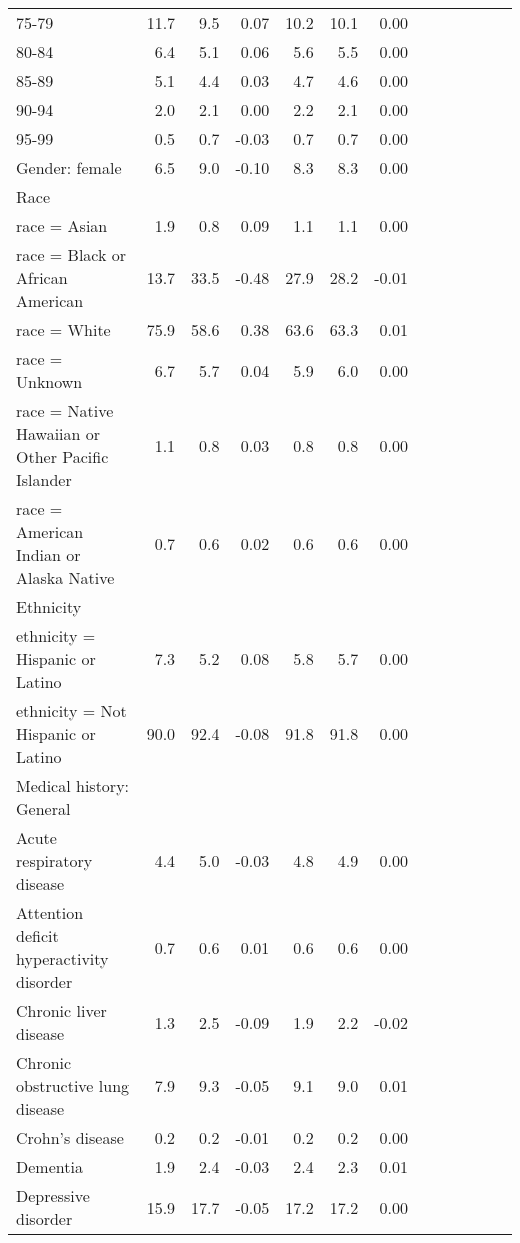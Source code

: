 \documentclass[11pt,]{article}
\begin{document}
\begin{longtable}{lrrrrrrrrrrrr}
      75-79 & 11.7 &  9.5 &  0.07 & 10.2 & 10.1 &  0.00 \\ 
      80-84 &  6.4 &  5.1 &  0.06 &  5.6 &  5.5 &  0.00 \\ 
      85-89 &  5.1 &  4.4 &  0.03 &  4.7 &  4.6 &  0.00 \\ 
      90-94 &  2.0 &  2.1 &  0.00 &  2.2 &  2.1 &  0.00 \\ 
      95-99 &  0.5 &  0.7 & -0.03 &  0.7 &  0.7 &  0.00 \\ 
  Gender: female &  6.5 &  9.0 & -0.10 &  8.3 &  8.3 &  0.00 \\ 
  Race &    &    &     &    &    &     \\ 
      race = Asian &  1.9 &  0.8 &  0.09 &  1.1 &  1.1 &  0.00 \\ 
      race = Black or African American & 13.7 & 33.5 & -0.48 & 27.9 & 28.2 & -0.01 \\ 
      race = White & 75.9 & 58.6 &  0.38 & 63.6 & 63.3 &  0.01 \\ 
      race = Unknown &  6.7 &  5.7 &  0.04 &  5.9 &  6.0 &  0.00 \\ 
      race = Native Hawaiian or Other Pacific Islander &  1.1 &  0.8 &  0.03 &  0.8 &  0.8 &  0.00 \\ 
      race = American Indian or Alaska Native &  0.7 &  0.6 &  0.02 &  0.6 &  0.6 &  0.00 \\ 
  Ethnicity &    &    &     &    &    &     \\ 
      ethnicity = Hispanic or Latino &  7.3 &  5.2 &  0.08 &  5.8 &  5.7 &  0.00 \\ 
      ethnicity = Not Hispanic or Latino & 90.0 & 92.4 & -0.08 & 91.8 & 91.8 &  0.00 \\ 
  Medical history: General &    &    &     &    &    &     \\ 
      Acute respiratory disease &  4.4 &  5.0 & -0.03 &  4.8 &  4.9 &  0.00 \\ 
      Attention deficit hyperactivity disorder &  0.7 &  0.6 &  0.01 &  0.6 &  0.6 &  0.00 \\ 
      Chronic liver disease &  1.3 &  2.5 & -0.09 &  1.9 &  2.2 & -0.02 \\ 
      Chronic obstructive lung disease &  7.9 &  9.3 & -0.05 &  9.1 &  9.0 &  0.01 \\ 
      Crohn's disease &  0.2 &  0.2 & -0.01 &  0.2 &  0.2 &  0.00 \\ 
      Dementia &  1.9 &  2.4 & -0.03 &  2.4 &  2.3 &  0.01 \\ 
      Depressive disorder & 15.9 & 17.7 & -0.05 & 17.2 & 17.2 &  0.00 \\ 

\end{longtable}
\end{document}
